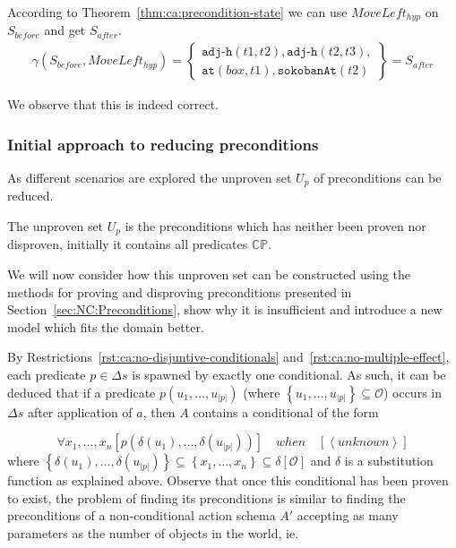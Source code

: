 \documentclass[\master/Master.tex]{subfiles}
\begin{document}
\begin{example}
    According to Theorem~\ref{thm:ca:precondition-state} we can use $MoveLeft_{hyp}$ on $S_{before}$ and get $S_{after}$.
    \begin{align*}
    &\gamma(S_{before},MoveLeft_{hyp}) =
        \left\{
            \begin{gathered}
                \texttt{adj-h}(t1, t2), \texttt{adj-h}(t2, t3), \\
                \texttt{at}(box,t1), \texttt{sokobanAt}(t2)
            \end{gathered}
        \right\}
        = S_{after}
    &
    \end{align*}

    We observe that this is indeed correct.
\end{example}

\subsubsection{Initial approach to reducing preconditions}

As different scenarios are explored the unproven set $U_p$ of preconditions can be reduced.

\begin{definition}
The unproven set $U_p$ is the preconditions which has neither been proven nor disproven, initially it contains all  predicates $\mathbb{CP}$.
\end{definition}

We will now consider how this unproven set can be constructed using the methods for proving and disproving preconditions presented in Section~\ref{sec:NC:Preconditions}, show why it is insufficient and introduce a new model which fits the domain better.

By Restrictions~\ref{rst:ca:no-disjuntive-conditionals} and~\ref{rst:ca:no-multiple-effect}, each predicate $p \in \Delta s$ is spawned by exactly one conditional. As such, it can be deduced that if a predicate $p\left(u_1, \dots, u_{|p|}\right)$ (where $\left\{u_1, \dots, u_{|p|}\right\} \subseteq \mathcal{O}$) occurs in $\Delta s$ after application of $a$, then $A$ contains a conditional of the form

\begin{equation*}
    \forall x_1, \dots, x_n 
        \left[ p\left(\delta\left(u_1\right), \dots, \delta \left(u_{|p|}\right) \right) \right] \quad when \quad 
        \left[ \left<unknown\right> \right]
\end{equation*}
where $\left\{\delta \left( u_1 \right), \dots, \delta \left(u_{|p|} \right) \right\} \subseteq \left\{ x_1, \dots, x_n \right\} \subseteq \delta [\mathcal{O}]$ and $\delta$ is a substitution function as explained above. Observe that once this conditional has been proven to exist, the problem of finding its preconditions is similar to finding the preconditions of a non-conditional action schema $A'$ accepting as many parameters as the number of objects in the world, ie. 
\end{document}

